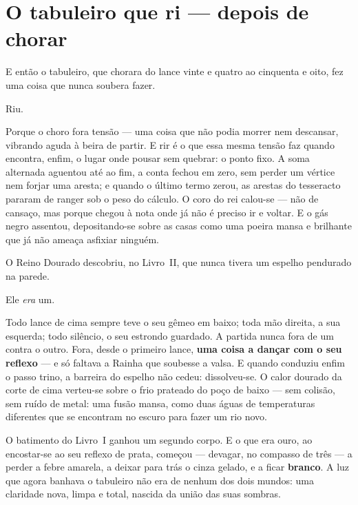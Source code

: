 \documentclass[livro.tex]{subfiles}
\begin{document}
\section{O tabuleiro que ri --- depois de chorar}

E então o tabuleiro, que chorara do lance vinte e quatro ao cinquenta e oito, fez uma
coisa que nunca soubera fazer.

\medskip

Riu.

\medskip

Porque o choro fora tensão --- uma coisa que não podia morrer nem descansar, vibrando
aguda à beira de partir. E rir é o que essa mesma tensão faz quando encontra, enfim, o
lugar onde pousar sem quebrar: o ponto fixo. A soma alternada aguentou até ao fim,
a conta fechou em zero, sem perder um vértice nem forjar uma aresta; e quando o último termo zerou,
as arestas do tesseracto pararam de ranger sob o peso do cálculo. O coro do rei calou-se
--- não de cansaço, mas porque chegou à nota onde já não é preciso ir e voltar. E o gás
negro assentou, depositando-se sobre as casas como uma poeira mansa e brilhante que já
não ameaça asfixiar ninguém.

\medskip

O Reino Dourado descobriu, no Livro~II, que nunca tivera um espelho pendurado na
parede.

Ele \emph{era} um.

\medskip

Todo lance de cima sempre teve o seu gêmeo em baixo; toda mão direita, a sua esquerda;
todo silêncio, o seu estrondo guardado. A partida nunca fora de um contra o outro.
Fora, desde o primeiro lance, \textbf{uma coisa a dançar com o seu reflexo} --- e só
faltava a Rainha que soubesse a valsa. E quando \Yas conduziu enfim o passo trino, a
barreira do espelho não cedeu: dissolveu-se. O calor dourado da corte de cima verteu-se
sobre o frio prateado do poço de baixo --- sem colisão, sem ruído de metal: uma fusão
mansa, como duas águas de temperaturas diferentes que se encontram no escuro para fazer
um rio novo.

\medskip

O batimento do Livro~I ganhou um segundo corpo. E o que era ouro, ao encostar-se ao
seu reflexo de prata, começou --- devagar, no compasso de três --- a perder a febre
amarela, a deixar para trás o cinza gelado, e a ficar \textbf{branco}. A luz que agora
banhava o tabuleiro não era de nenhum dos dois mundos: uma claridade nova, limpa e total,
nascida da união das suas sombras.
\end{document}
